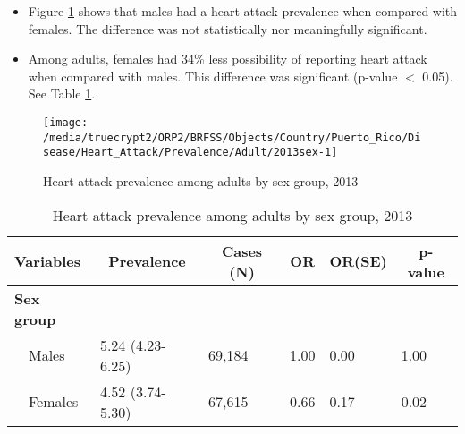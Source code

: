\newpage
\begin{itemize}

\item Figure \ref{fig:sex.Heart_Attack.2013} shows that males had a 
heart attack prevalence when compared with females. The difference was not statistically nor meaningfully significant.


\item Among adults, females had 34\% less possibility of reporting heart attack when compared with males. This difference was significant (p-value $<$ 0.05). See Table \ref{tab:sex.Heart_Attack.2013}.

\end{itemize}

\begin{figure}[H]
\caption{Heart attack prevalence among adults by sex group, 
2013}
\begin{knitrout}
\color{fgcolor}

{\centering \texttt{[image: /media/truecrypt2/ORP2/BRFSS/Objects/Country/Puerto\_Rico/Disease/Heart\_Attack/Prevalence/Adult/2013sex-1]} 

}



\end{knitrout}
\label{fig:sex.Heart_Attack.2013}
\end{figure}

\begin{table}[H]
\caption{Heart attack prevalence  among adults by sex group, 2013\label{tab:sex.Heart_Attack.2013}} 
\begin{center}
\begin{tabular}{llllll}
\hline\hline
\multicolumn{1}{l}{Variables}&\multicolumn{1}{c}{Prevalence}&\multicolumn{1}{c}{Cases (N)}&\multicolumn{1}{c}{OR}&\multicolumn{1}{c}{OR(SE)}&\multicolumn{1}{c}{p-value}\tabularnewline
\hline
{\bfseries Sex group}&&&&&\tabularnewline
~~Males&5.24 (4.23-6.25)&69,184&1.00&0.00&1.00\tabularnewline
~~Females&4.52 (3.74-5.30)&67,615&0.66&0.17&0.02\tabularnewline
\hline
\end{tabular}\end{center}

\end{table}


